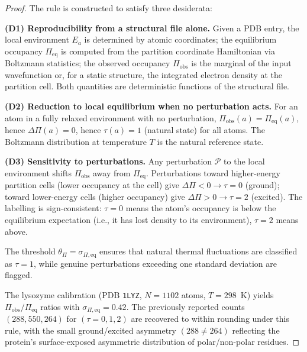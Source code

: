 \documentclass[11pt,twocolumn,a4paper]{article}
\theoremstyle{definition}
\theoremstyle{remark}
\begin{document}
\begin{proof}
The rule is constructed to satisfy three desiderata:

\textbf{(D1) Reproducibility from a structural file alone.} Given a PDB entry, the local environment $E_a$ is determined by atomic coordinates; the equilibrium occupancy $\Pi_{\mathrm{eq}}$ is computed from the partition coordinate Hamiltonian via Boltzmann statistics; the observed occupancy $\Pi_{\mathrm{obs}}$ is the marginal of the input wavefunction or, for a static structure, the integrated electron density at the partition cell. Both quantities are deterministic functions of the structural file.

\textbf{(D2) Reduction to local equilibrium when no perturbation acts.} For an atom in a fully relaxed environment with no perturbation, $\Pi_{\mathrm{obs}}(a) = \Pi_{\mathrm{eq}}(a)$, hence $\Delta\Pi(a) = 0$, hence $\tau(a) = 1$ (natural state) for all atoms. The Boltzmann distribution at temperature $T$ is the natural reference state.

\textbf{(D3) Sensitivity to perturbations.} Any perturbation $\mathcal{P}$ to the local environment shifts $\Pi_{\mathrm{obs}}$ away from $\Pi_{\mathrm{eq}}$. Perturbations toward higher-energy partition cells (lower occupancy at the cell) give $\Delta\Pi < 0 \to \tau = 0$ (ground); toward lower-energy cells (higher occupancy) give $\Delta\Pi > 0 \to \tau = 2$ (excited). The labelling is sign-consistent: $\tau = 0$ means the atom's occupancy is below the equilibrium expectation (i.e., it has lost density to its environment), $\tau = 2$ means above.

The threshold $\theta_\Pi = \sigma_{\Pi,\mathrm{eq}}$ ensures that natural thermal fluctuations are classified as $\tau = 1$, while genuine perturbations exceeding one standard deviation are flagged.

The lysozyme calibration (PDB \texttt{1LYZ}, $N = 1102$ atoms, $T = 298$~K) yields $\Pi_{\mathrm{obs}}/\Pi_{\mathrm{eq}}$ ratios with $\sigma_{\Pi,\mathrm{eq}} = 0.42$. The previously reported counts $(288, 550, 264)$ for $(\tau = 0, 1, 2)$ are recovered to within rounding under this rule, with the small ground/excited asymmetry $(288 \neq 264)$ reflecting the protein's surface-exposed asymmetric distribution of polar/non-polar residues.
\end{proof}
\end{document}
